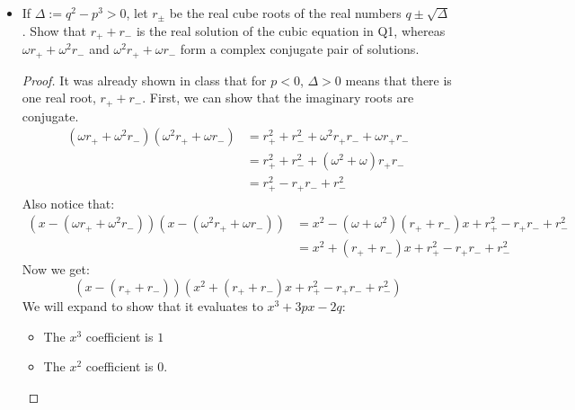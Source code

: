 \documentclass{article}
\begin{document}
\begin{itemize}
        \item If $\Delta := q^{2} - p^{3} > 0$, let $r_{\pm}$ be the real cube roots of the real numbers $q \pm \sqrt{\Delta}$. Show that $r_{+} + r_{-}$ is the real solution of the cubic equation in Q1, whereas $\omega r_{+} + \omega^{2} r_{-}$ and $\omega^{2}r_{+} + \omega r_{-}$ form a complex conjugate pair of solutions.
            \begin{proof}
                It was already shown in class that for $p < 0$, $\Delta > 0$ means that there is one real root, $r_{+} + r_{-}$. First, we can show that the imaginary roots are conjugate.
                    \begin{align*}
                        (\omega r_{+} + \omega^{2} r_{-})(\omega^{2}r_{+} + \omega r_{-}) &= r_{+}^{2} + r_{-}^{2} + \omega^{2}r_{+}r_{-} + \omega r_{+}r_{-} \\
                                                                                          &= r_{+}^{2} + r_{-}^{2} + (\omega^{2} + \omega)r_{+}r_{-}          \\
                                                                                          &= r_{+}^{2} - r_{+}r_{-} + r_{-}^{2}                                 
                    \end{align*}
                Also notice that:
                    \begin{align*}
                        (x - (\omega r_{+} + \omega^{2}r_{-}))(x - (\omega^{2}r_{+} + \omega r_{-})) &= x^{2} - (\omega + \omega^{2})(r_{+} + r_{-})x + r_{+}^{2} - r_{+}r_{-} + r^{2}_{-} \\
                                                                                                     &= x^{2} + (r_{+} + r_{-})x + r^{2}_{+} - r_{+}r_{-} + r_{-}^{2}                        
                    \end{align*}
                Now we get:
                    \begin{equation*}
                        (x - (r_{+} + r_{-}))(x^{2} + (r_{+} + r_{-})x + r_{+}^{2} - r_{+}r_{-} + r_{-}^{2})
                    \end{equation*}
                We will expand to show that it evaluates to $x^{3} + 3px - 2q$:
                    \begin{itemize}
                        \item The $x^{3}$ coefficient is $1$

                        \item The $x^{2}$ coefficient is $0$.


\end{itemize}
\end{proof}
\end{itemize}
\end{document}
